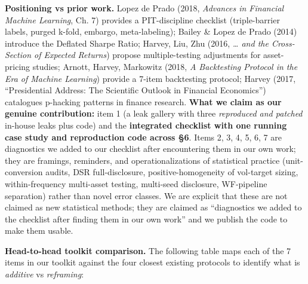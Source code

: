 \documentclass[
]{article}
\begin{document}
\textbf{Positioning vs prior work.} Lopez de Prado (2018, \emph{Advances
in Financial Machine Learning}, Ch. 7) provides a PIT-discipline
checklist (triple-barrier labels, purged k-fold, embargo,
meta-labeling); Bailey \& Lopez de Prado (2014) introduce the Deflated
Sharpe Ratio; Harvey, Liu, Zhu (2016, \emph{\ldots{} and the
Cross-Section of Expected Returns}) propose multiple-testing adjustments
for asset-pricing studies; Arnott, Harvey, Markowitz (2018, \emph{A
Backtesting Protocol in the Era of Machine Learning}) provide a 7-item
backtesting protocol; Harvey (2017, ``Presidential Address: The
Scientific Outlook in Financial Economics'') catalogues p-hacking
patterns in finance research. \textbf{What we claim as our genuine
contribution:} item 1 (a leak gallery with three \emph{reproduced and
patched} in-house leaks plus code) and the \textbf{integrated checklist
with one running case study and reproduction code across §6}. Items 2,
3, 4, 5, 6, 7 are diagnostics we added to our checklist after
encountering them in our own work; they are framings, reminders, and
operationalizations of statistical practice (unit-conversion audits, DSR
full-disclosure, positive-homogeneity of vol-target sizing,
within-frequency multi-asset testing, multi-seed disclosure, WF-pipeline
separation) rather than novel error classes. We are explicit that these
are not claimed as new statistical methods; they are claimed as
``diagnostics we added to the checklist after finding them in our own
work'' and we publish the code to make them usable.

\textbf{Head-to-head toolkit comparison.} The following table maps each
of the 7 items in our toolkit against the four closest existing
protocols to identify what is \emph{additive} vs \emph{reframing}:
\end{document}
